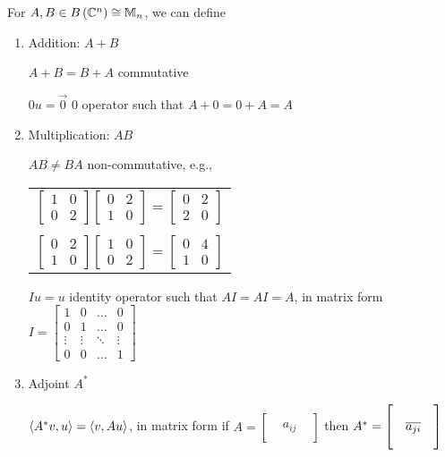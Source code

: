 For $A, B \in B\left(\mathbb{C}^n\right) \cong \mathbb{M}_n$, we can define
\begin{enumerate}[label=\arabic*)]
    \item \label{item:algadd}Addition: $A + B$

          $A + B = B + A$ commutative

          $0u = \vec{0}$ 0 operator such that $A + 0 = 0 + A = A$
    \item \label{item:algmul}Multiplication: $AB$

          $AB \neq BA$ non-commutative, e.g., \begin{tabular}{l}$\begin{bmatrix}1&0\\0&2\end{bmatrix}\begin{bmatrix}0&2\\1&0\end{bmatrix} = \begin{bmatrix}0&2\\2&0\end{bmatrix}$\\\\$\begin{bmatrix}0&2\\1&0\end{bmatrix}\begin{bmatrix}1&0\\0&2\end{bmatrix} = \begin{bmatrix}0&4\\1&0\end{bmatrix}$\end{tabular}

          $Iu = u$ identity operator such that $AI = AI = A$, in matrix form $I = \begin{bmatrix}1 & 0 & \dots & 0\\0 & 1 & \dots & 0\\\vdots & \vdots& \ddots & \vdots\\0 & 0 & \dots & 1\end{bmatrix}$
    \item \label{item:algadj}Adjoint $A^*$

          $\left\langle A^*v, u\right\rangle = \left\langle v, Au\right\rangle$, in matrix form if $A = \begin{bmatrix}&&\\&a_{ij}&\\&&\end{bmatrix}$ then $A^* = \begin{bmatrix}&&\\&\overline{a_{ji}}&\\&&\end{bmatrix}$


\end{enumerate}
